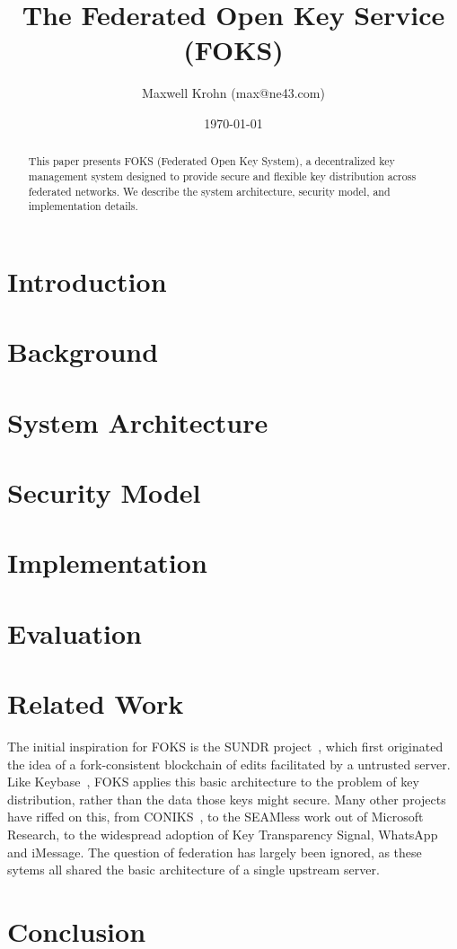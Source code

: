 \documentclass[11pt]{article}
\title{The Federated Open Key Service (FOKS)}
\author{Maxwell Krohn (max@ne43.com)}
\date{\today}
\begin{document}
\maketitle

\begin{abstract}
This paper presents FOKS (Federated Open Key System), a decentralized key management system designed to provide secure and flexible key distribution across federated networks. We describe the system architecture, security model, and implementation details.
\end{abstract}

\section{Introduction}

\section{Background}

\section{System Architecture}

\section{Security Model}

\section{Implementation}

\section{Evaluation}

\section{Related Work}

The initial inspiration for FOKS is the SUNDR project~\cite{sundr}, which first
originated the idea of a fork-consistent blockchain of edits facilitated by a
untrusted server.  Like Keybase~\cite{keybase}, FOKS applies this basic
architecture to the problem of key distribution, rather than the data those keys
might secure. Many other projects have riffed on this, from
CONIKS~\cite{coniks}, to the SEAMless work out of Microsoft Research, to the
widespread adoption of Key Transparency Signal, WhatsApp and iMessage.
The question of federation has largely been ignored, as these sytems all
shared the basic architecture of a single upstream server.

\section{Conclusion}



\end{document}
